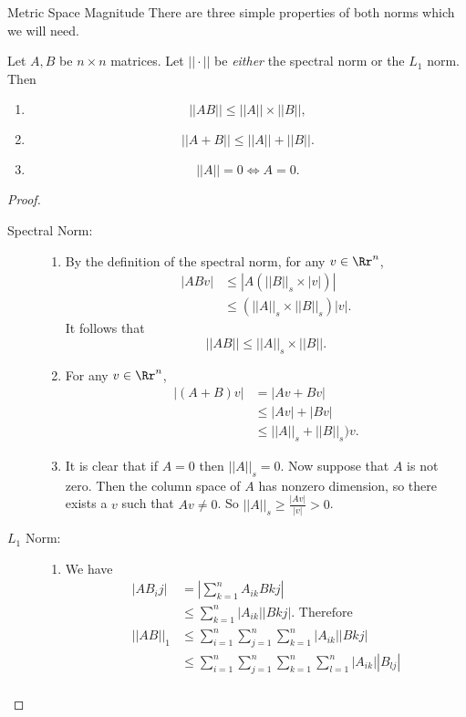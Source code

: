 \documentclass[12pt]{pom_thesis}
\begin{document}
\begin{chapter}{Metric Space Magnitude}
There are three simple properties of both norms which we will need.
\begin{lemma}\label{lem:norm_prop}
Let $A, B$ be $n \times n$ matrices. Let $||\cdot||$ be \emph{either} the spectral norm or the $L_1$ norm. Then
\begin{enumerate}
\item \[
||AB|| \leq ||A||\times ||B||,
\]

\item
\[
||A + B|| \leq ||A|| + ||B||.
\]
\item 
\[
||A|| = 0 \iff A = 0.
\]
\end{enumerate}
\end{lemma}
\begin{proof}
\begin{description}
\item[Spectral Norm:]
\begin{enumerate}
\item By the definition of the spectral norm, for any $v \in \Rr^n$,
\begin{align*}
|ABv| &\leq |A(||B||_s \times |v|)|\\
&\leq (||A||_s \times ||B||_s)|v|.
\end{align*}
It follows that 
 \[
||AB|| \leq ||A||_s\times ||B||.
\]
\item For any $v \in \Rr^n$,
\begin{align*}
|(A + B)v| &= |Av + Bv|\\
 &\leq |Av| + |Bv|\\
 &\leq ||A||_s + ||B||_s)v.
\end{align*}
\item It is clear that if $A=0$ then $||A||_s=0$. Now suppose that $A$ is not zero. Then the column space of $A$ has nonzero dimension, so there exists a $v$ such that $Av \neq 0$. So $||A||_s \geq \frac{|Av|}{|v|} > 0$.
\end{enumerate}
\item[$L_1$ Norm:]
\begin{enumerate}
\item We have
\begin{align*}
|AB_ij| &= \left| \sum_{k = 1}^nA_{ik}B{kj}\right|\\
&\leq \sum_{k = 1}^n|A_{ik}||B{kj}|. \text{ Therefore}\\
||AB||_1 &\leq \sum_{i = 1}^n\sum_{j=1}^n\sum_{k=1}^n|A_{ik}||B{kj}|\\
&\leq \sum_{i = 1}^n\sum_{j=1}^n\sum_{k=1}^n\sum_{l=1}^n|A_{ik}||B_{lj}|\\

\end{align*}
\end{enumerate}
\end{description}
\end{proof}
\end{chapter}
\end{document}
